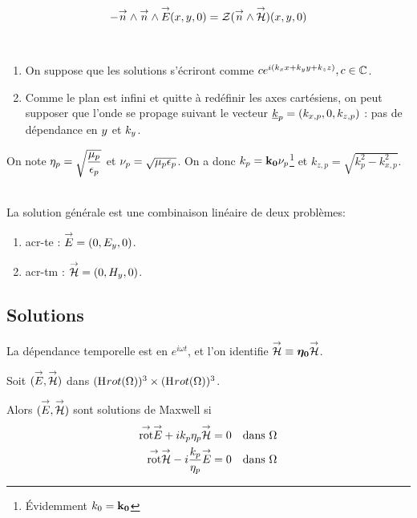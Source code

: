 \begin{equation}
\label{eq:coeff_ref:intro:ci}
-{\overset{\rightarrow}{n}} \wedge {\overset{\rightarrow}{n}} \wedge {\overset{\rightarrow}{E}}({x},{y},0) = \mathcal{Z}( {\overset{\rightarrow}{n}} \wedge {\overset{\rightarrow}{\mathcal{H}}})({x},{y},0)
\end{equation}

\begin{hyp}{}~\\
\begin{enumerate}
    \item On suppose que les solutions s'écriront comme $c e^{i(k_{x}{x} +k_{y}{y}+k_{z}{z})}, c\in\mathbb C$.
    \item Comme le plan est infini et quitte à redéfinir les axes cartésiens, on peut supposer que l'onde se propage suivant le vecteur $\underline{k}_p = (k_{{x},p},0,k_{{z},p})$ : pas de dépendance en ${y}$ et $k_{y}$.
\end{enumerate}
\end{hyp}

On note $\eta_p = \sqrt{\dfrac{\mu_p}{\epsilon_p}}$ et $\nu_p = \sqrt{\mu_p \epsilon_p}$.
On a donc $k_p = \mathbf{k_0}\nu_p$\footnote{Évidemment $k_0 = \mathbf{k_0}$} et $k_{z,p} = \sqrt{k_p^2 - k_{x,p}^2}$.

\begin{hyp}{}~\\
La solution générale est une combinaison linéaire de deux problèmes: 
\begin{enumerate}
    \item \gls{acr-te} : ${\overset{\rightarrow}{E}} = (0,E_y,0)$.
    \item \gls{acr-tm} : ${\overset{\rightarrow}{\mathcal{H}}} = (0,H_y,0)$. 
\end{enumerate}
\end{hyp}

\subsection{Solutions}

\begin{tcolorbox}
\centering
La dépendance temporelle est en $e^{i \omega t}$, et l'on identifie ${\overset{\rightarrow}{\mathcal{H}}} \equiv \boldsymbol{\eta_0} {\overset{\rightarrow}{\mathcal{H}}}$.
\end{tcolorbox}


Soit $({\overset{\rightarrow}{E}},{\overset{\rightarrow}{\mathcal{H}}})$ dans $(\mathrm{H}_\mathrm{{}}{rot}(\Omega))^3 \times (\mathrm{H}_\mathrm{{}}{rot}(\Omega))^3$. 

Alors $({\overset{\rightarrow}{E}},{\overset{\rightarrow}{\mathcal{H}}})$ sont solutions de Maxwell si 
\begin{align}
\label{eq:coeffs_ref:maxwell-E}
{{\overset{\rightarrow}{\operatorname{rot}}}} {\overset{\rightarrow}{E}} + i k_p \eta_p {\overset{\rightarrow}{\mathcal{H}}} &= 0 && \text{dans $\Omega$}\\
\label{eq:coeffs_ref:maxwell-H}
{{\overset{\rightarrow}{\operatorname{rot}}}} {\overset{\rightarrow}{\mathcal{H}}} - i \dfrac{k_p}{\eta_p} {\overset{\rightarrow}{E}} &= 0 && \text{dans $\Omega$}
\end{align}

